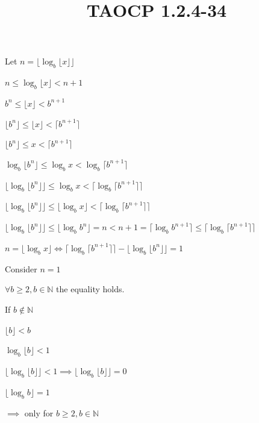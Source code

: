 \documentclass{article}
\title{TAOCP 1.2.4\mbox{-}34}
\begin{document}
\maketitle

Let \( n = \lfloor \log_b{\lfloor x \rfloor}\rfloor \)

\( n \leq \log_b{\lfloor x \rfloor} < n + 1 \)

\( b^{n} \leq \lfloor x \rfloor < b^{n+1} \)

\( \lfloor b^{n} \rfloor \leq \lfloor x \rfloor < \lceil b^{n+1} \rceil \)

\( \lfloor b^{n} \rfloor \leq x < \lceil b^{n+1} \rceil \)

\( \log_{b} \lfloor b^{n} \rfloor \leq \log_b{x} < \log_{b}\lceil b^{n+1} \rceil \)

\( \lfloor \log_{b} \lfloor b^{n} \rfloor \rfloor \leq \log_b{x} < \lceil \log_{b}\lceil b^{n+1} \rceil \rceil \)

\( \lfloor \log_{b} \lfloor b^{n} \rfloor \rfloor \leq \lfloor \log_b{x} \rfloor < \lceil \log_{b}\lceil b^{n+1} \rceil \rceil \)

\( \lfloor \log_{b} \lfloor b^{n} \rfloor \rfloor \leq \lfloor \log_{b}  b^{n} \rfloor = n < n + 1 = \lceil \log_{b} b^{n+1} \rceil \leq \lceil \log_{b}\lceil b^{n+1} \rceil \rceil \)

\( n = \lfloor \log_b{x} \rfloor \iff \lceil \log_{b}\lceil b^{n+1} \rceil \rceil -\lfloor \log_{b} \lfloor b^{n} \rfloor \rfloor = 1 \)

Consider \( n = 1 \)

\( \forall b \geq 2, b \in \mathbb{N} \) the equality holds.

If \( b \notin \mathbb{N} \)

\( \lfloor b \rfloor < b \)

\( \log_b{\lfloor b \rfloor} < 1 \)

\( \lfloor\log_b{\lfloor b \rfloor}\rfloor < 1 \implies \lfloor\log_b{\lfloor b \rfloor}\rfloor = 0 \)

\( \lfloor \log_{b} b \rfloor = 1 \)

\( \implies \) only for \( b \geq 2, b \in \mathbb{N} \)
\end{document}
